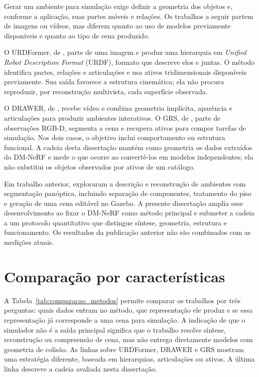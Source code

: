 Gerar um ambiente para simulação exige definir a geometria dos objetos e, conforme a aplicação, suas partes móveis e relações. Os trabalhos a seguir partem de imagens ou vídeos, mas diferem quanto ao uso de modelos previamente disponíveis e quanto ao tipo de cena produzido.

O URDFormer, de \citet{chen2024urdformer}, parte de uma imagem e produz uma hierarquia em \textit{Unified Robot Description Format} (URDF), formato que descreve elos e juntas. O método identifica partes, relações e articulações e usa ativos tridimensionais disponíveis previamente. Sua saída favorece a estrutura cinemática; ela não procura reproduzir, por reconstrução multivista, cada superfície observada.

O DRAWER, de \citet{xia2025drawer}, recebe vídeo e combina geometria implícita, aparência e articulações para produzir ambientes interativos. O GRS, de \citet{zook2025grs}, parte de observações RGB-D, segmenta a cena e recupera ativos para compor tarefas de simulação. Nos dois casos, o objetivo inclui comportamento ou estrutura funcional. A cadeia desta dissertação mantém como geometria os dados extraídos do DM-NeRF e mede o que ocorre ao convertê-los em modelos independentes; ela não substitui os objetos observados por ativos de um catálogo.

Em trabalho anterior, \citet{lemos2025digital} exploraram a descrição e reconstrução de ambientes com segmentação panóptica, incluindo separação de componentes, tratamento do piso e geração de uma cena editável no Gazebo. A presente dissertação amplia esse desenvolvimento ao fixar o DM-NeRF como método principal e submeter a cadeia a um protocolo quantitativo que distingue síntese, geometria, estrutura e funcionamento. Os resultados da publicação anterior não são combinados com as medições atuais.

\section{Comparação por características}

A Tabela~\ref{tab:comparacao_metodos} permite comparar os trabalhos por três perguntas: quais dados entram no método, que representação ele produz e se essa representação já corresponde a uma cena para simulação. A indicação de que o simulador não é a saída principal significa que o trabalho resolve síntese, reconstrução ou compreensão de cena, mas não entrega diretamente modelos com geometria de colisão. As linhas sobre URDFormer, DRAWER e GRS mostram uma estratégia diferente, baseada em hierarquias, articulações ou ativos. A última linha descreve a cadeia avaliada nesta dissertação.

